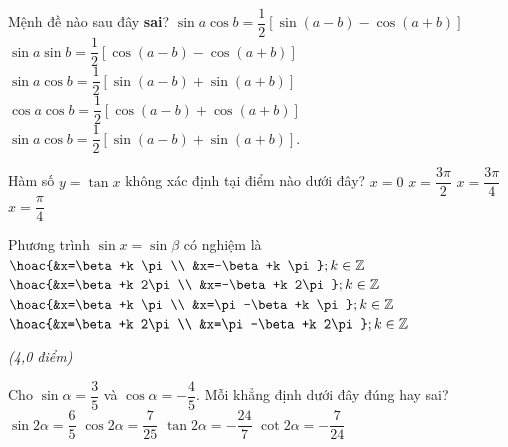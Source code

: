 \begin{ex}%
Mệnh đề nào sau đây \textbf{sai}?
\choice
{\True $\sin a\cos b=\dfrac{1}{2}\left[\sin (a-b)-\cos (a+b)\right]$}
{$\sin a\sin b=\dfrac{1}{2}\left[\cos (a-b)-\cos (a+b)\right]$}
{$\sin a\cos b=\dfrac{1}{2}\left[\sin (a-b)+\sin (a+b)\right]$}
{$\cos a\cos b=\dfrac{1}{2}\left[\cos (a-b)+\cos (a+b)\right]$}
\loigiai
{$\sin a\cos b=\dfrac{1}{2}\left[\sin (a-b)+\sin (a+b)\right]$.
}
\end{ex}

\begin{ex}%
Hàm số $y=\tan x$ không xác định tại điểm nào dưới đây?
\choice
{$x=0$}
{\True $x=\dfrac{3 \pi}{2}$}
{$x=\dfrac{3 \pi}{4}$}
{$x=\dfrac{\pi}{4}$}
\end{ex}

\begin{ex}%
Phương trình $\sin x=\sin \beta$ có nghiệm là
\choice
{$\hoac{&x=\beta+k \pi \\
&x=-\beta+k \pi}; k \in \mathbb{Z}$}
{$\hoac{&x=\beta+k 2\pi \\
&x=-\beta+k 2\pi}; k \in \mathbb{Z}$}
{$\hoac{&x=\beta+k \pi \\
&x=\pi-\beta+k \pi}; k \in \mathbb{Z}$}
{\True $\hoac{&x=\beta+k 2\pi \\
&x=\pi-\beta+k 2\pi}; k \in \mathbb{Z}$}
\end{ex}

\TNTF \textit{(4,0 điểm)}
\begin{ex}%
Cho $\sin\alpha=\dfrac{3}{5}$ và $\cos \alpha=-\dfrac{4}{5}$. Mỗi khẳng định dưới đây đúng hay sai?
\choiceTF
{$\sin2\alpha=\dfrac{6}{5}$}
{\True $\cos2\alpha=\dfrac{7}{25}$}
{\True $\tan2\alpha=-\dfrac{24}{7}$}
{\True $\cot2\alpha=-\dfrac{7}{24}$}
\end{ex}

